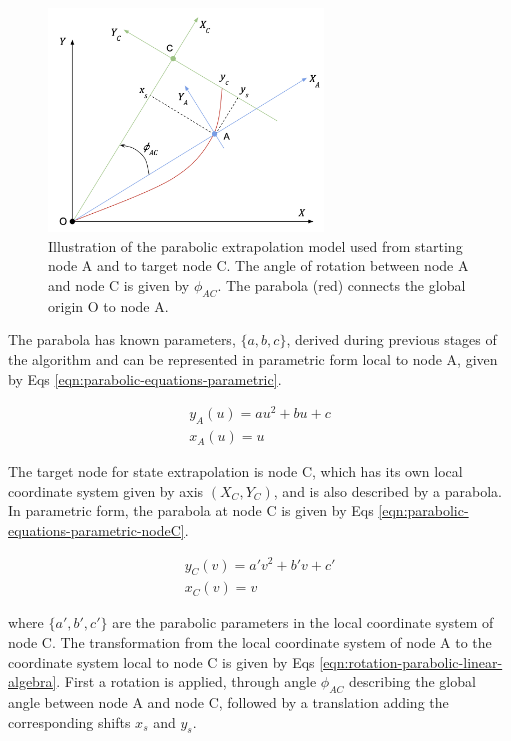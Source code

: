 \begin{figure}[htbp]
    \centering
    \includegraphics[width=0.65\textwidth]{images/6-trackml/extrapolation-model-xy-trackml-2.png}
    \caption{Illustration of the parabolic extrapolation model used from starting node A and to target node C. The angle of rotation between node A and node C is given by $\phi_{AC}$. The parabola (red) connects the global origin O to node A.}
    \label{fig:trackml-parabolic-extrapolation-model-xy}%
\end{figure}

The parabola has known parameters, $\{a, b, c\}$, derived during previous stages of the algorithm and can be represented in parametric form local to node A, given by Eqs \eqref{eqn:parabolic-equations-parametric}.

\begin{equation}
\begin{aligned}
y_A(u) = au^{2} + bu + c \\
x_A(u) = u
\end{aligned}
\label{eqn:parabolic-equations-parametric}
\end{equation}

The target node for state extrapolation is node C, which has its own local coordinate system given by axis $(X_C, Y_C)$, and is also described by a parabola. In parametric form, the parabola at node C is given by Eqs \eqref{eqn:parabolic-equations-parametric-nodeC}.

\begin{equation}
\begin{aligned}
y_C(v) = a'v^{2} + b'v + c' \\
x_C(v) = v
\end{aligned}
\label{eqn:parabolic-equations-parametric-nodeC}
\end{equation}

where $\{a', b', c' \}$ are the parabolic parameters in the local coordinate system of node C. The transformation from the local coordinate system of node A to the coordinate system local to node C is given by Eqs \eqref{eqn:rotation-parabolic-linear-algebra}. First a rotation is applied, through angle $\phi_{AC}$ describing the global angle between node A and node C, followed by a translation adding the corresponding shifts $x_s$ and $y_s$.

